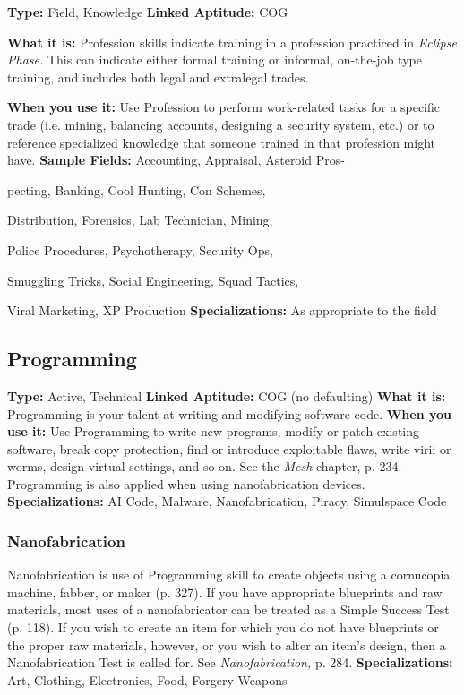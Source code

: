 \textbf{Type:} Field, Knowledge
\textbf{Linked Aptitude:} COG

\textbf{What it is:} Profession skills indicate training in a 
profession practiced in \textit{Eclipse Phase.} This can indicate
either formal training or informal, on-the-job type
training, and includes both legal and extralegal trades.

\textbf{When you use it:} Use Profession to perform work-related
tasks for a specific trade (i.e. mining, balancing
accounts, designing a security system, etc.) or to reference
specialized knowledge that someone trained in
that profession might have.
\textbf{Sample Fields:} Accounting, Appraisal, Asteroid Pros-

pecting, Banking, Cool Hunting, Con Schemes, 

Distribution, Forensics, Lab Technician, Mining, 

Police Procedures, Psychotherapy, Security Ops, 

Smuggling Tricks, Social Engineering, Squad Tactics, 

Viral Marketing, XP Production
\textbf{Specializations:} As appropriate to the field

\subsection{Programming}

\textbf{Type:} Active, Technical
\textbf{Linked Aptitude:} COG (no defaulting)
\textbf{What it is:} Programming is your talent at writing 
and modifying software code.
\textbf{When you use it:} Use Programming to write new 
programs, modify or patch existing software, break 
copy protection, find or introduce exploitable flaws, 
write virii or worms, design virtual settings, and so 
on. See the \textit{Mesh} chapter, p. 234. Programming is also 
applied when using nanofabrication devices.
\textbf{Specializations:} AI Code, Malware, Nanofabrication, 
Piracy, Simulspace Code

\subsubsection{Nanofabrication}

Nanofabrication is use of Programming skill to create 
objects using a cornucopia machine, fabber, or maker 
(p. 327). If you have appropriate blueprints and raw 
materials, most uses of a nanofabricator can be treated 
as a Simple Success Test (p. 118). If you wish to create 
an item for which you do not have blueprints or the 
proper raw materials, however, or you wish to alter an 
item's design, then a Nanofabrication Test is called for. 
See \textit{Nanofabrication,} p. 284.
\textbf{Specializations:} Art, Clothing, Electronics, Food, Forgery
Weapons

